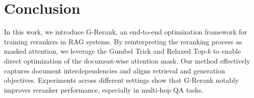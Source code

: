 \section{Conclusion}
In this work, we introduce G-Rerank, an end-to-end optimization framework for training rerankers in RAG systems. By reinterpreting the reranking process as masked attention, we leverage the Gumbel Trick and Relaxed Top-\( k \) to enable direct optimization of the document-wise attention mask. Our method effectively captures document interdependencies and aligns retrieval and generation objectives. Experiments across different settings show that G-Rerank notably improves reranker performance, especially in multi-hop QA tasks.